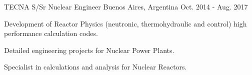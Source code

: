 \begin{cventries}
  \cventry
    {TECNA}
    {S/Sr Nuclear Engineer}
    {Buenos Aires, Argentina}
    {Oct. 2014 - Aug. 2017}
    {
      \begin{cvitems}
        \item{Development of Reactor Physics (neutronic, thermohydraulic and control) high performance calculation codes.}
        \item{Detailed engineering projects for Nuclear Power Plants.}
        \item{Specialist in calculations and analysis for Nuclear Reactors.}
      \end{cvitems}
    }

\end{cventries}
